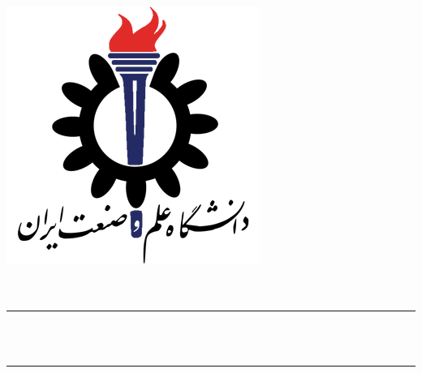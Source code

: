 \begin{titlepage}
    \centering
    \includegraphics[scale = 0.5]{Images/IUSTLogo.png}\\
    \Huge{\Faculty}\\[0.2 cm]
    \huge{\Course}\\[0.2 cm]
    \LARGE{\Semester}
    
    \rule{\linewidth}{1.0 mm}
    \huge{\Subject}\\[0.2 cm]
    \LARGE{\Title}\\[0.4 cm]
    \rule{\linewidth}{1.0 mm}\\[1.0 cm]
    
    \LARGE
    \begin{minipage}{0.95 \textwidth}
        \centering
	    \Prof \dotfill \prof\\[0.15 cm]
	    \Members \dotfill \members\\[0.15 cm]
	    \SID \dotfill \sid\\[0.15 cm]
	\end{minipage}

\end{titlepage}